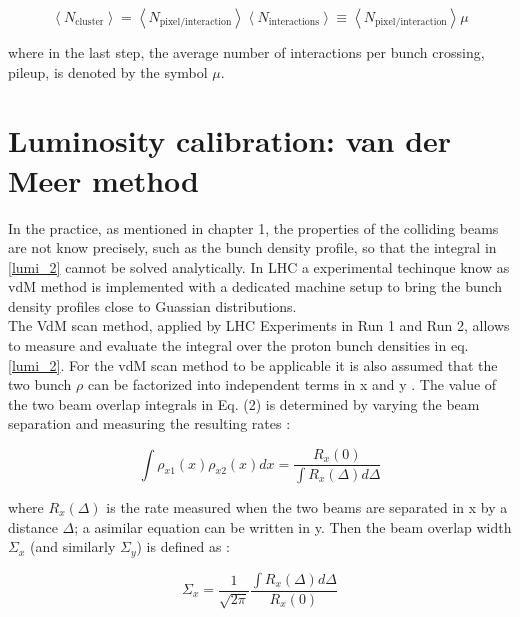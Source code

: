 \begin{equation}
\left < N_{\text{cluster}} \right > = \left < N_{\text{pixel}/\text{interaction}} \right >  \left < N_{\text{interactions}} \right > \equiv \left < N_{\text{pixel}/\text{interaction}} \right > \mu
\end{equation}

where in the last step, the average number of interactions per bunch crossing, pileup, is denoted by the symbol $\mu$.


\section{Luminosity calibration: van der Meer method}
In the practice, as mentioned in chapter 1, the properties of the colliding beams are not know precisely, such as the bunch density profile, so that the integral in \ref{lumi_2} cannot be solved analytically. In LHC a experimental techinque know as vdM method is implemented  with a dedicated machine setup to bring the bunch density profiles close to Guassian distributions.\\
The VdM scan method, %
applied by LHC Experiments in Run 1 and Run 2, allows to measure and evaluate the integral over the proton bunch densities in eq. \ref{lumi_2}. For the vdM scan method to be applicable it is also assumed that the two bunch $\rho$ can be factorized into independent terms in x and y \cite{pas-15}.  The value of the two beam overlap integrals in Eq. (2) is determined by varying the beam separation and measuring the resulting rates \cite{pas_18}:

\begin{equation}
\int \rho_{x1}(x) \rho_{x2}(x) dx = \frac{R_{x}(0)}{\int R_{x}(\Delta) d\Delta}
\end{equation}

where $R_{x}(\Delta)$ is the rate measured when the two beams are separated in x by a distance $\Delta$; a asimilar equation can be written in y. Then the beam overlap width $\Sigma_{x}$ (and similarly $\Sigma_{y}$) is defined as \cite{pas_18}:

\begin{equation}
\Sigma_{x}= \frac{1}{\sqrt{2\pi}} \frac{\int R_{x}(\Delta)d\Delta}{R_{x}(0)}
\end{equation}

